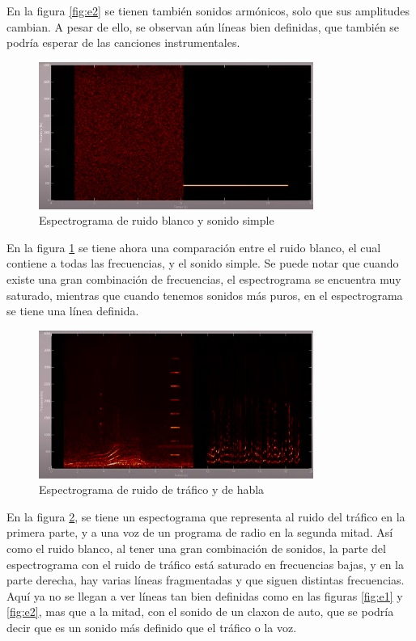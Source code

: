 \documentclass[12pt, letterpaper]{article}
\begin{document}
\noindent En la figura \ref{fig:e2} se tienen también sonidos armónicos,
solo que sus amplitudes cambian. A pesar de ello, se observan aún líneas
bien definidas, que también se podría esperar de las canciones instrumentales.

\begin{figure}[H]
  \centering
  \includegraphics[width=0.8\textwidth]{imgs/investigacion/espectrogramas_04.png}
  \caption{Espectrograma de ruido blanco y sonido simple \cite{Colomer-04}}
  \label{fig:e4}
\end{figure}

\noindent En la figura \ref{fig:e4} se tiene ahora una comparación entre
el ruido blanco, el cual contiene a todas las frecuencias, y el sonido simple.
Se puede notar que cuando existe una gran combinación de frecuencias, el espectrograma
se encuentra muy saturado, mientras que cuando tenemos sonidos más puros, en el
espectrograma se tiene una línea definida.

\begin{figure}[H]
  \centering
  \includegraphics[width=0.8\textwidth]{imgs/investigacion/espectrogramas_05.png}
  \caption{Espectrograma de ruido de tráfico y de habla \cite{Colomer-05}}
  \label{fig:e5}
\end{figure}

\noindent En la figura \ref{fig:e5}, se tiene un espectograma que representa al
ruido del tráfico en la primera parte, y a una voz de un programa de radio en la segunda
mitad. Así como el ruido blanco, al tener una gran combinación de sonidos, la
parte del espectrograma con el ruido de tráfico está saturado en frecuencias bajas,
y en la parte derecha, hay varias líneas fragmentadas y que siguen distintas frecuencias.
Aquí ya no se llegan a ver líneas tan bien definidas como en las figuras
\ref{fig:e1} y \ref{fig:e2}, mas que a la mitad, con el
sonido de un claxon de auto, que se podría decir que es un sonido más definido
que el tráfico o la voz. \medskip
\end{document}
